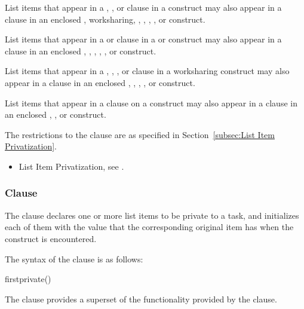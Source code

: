 List items that appear in a , , or
 clause in a  construct may also appear
in a  clause in an enclosed ,
worksharing, , , , , or
 construct.

List items that appear in a  or 
clause in a  or  construct may also appear in a 
clause in an enclosed , , , , , or
 construct.

List items that appear in a , ,
, or  clause in a worksharing
construct may also appear in a  clause in an enclosed
, , , , or  construct.

List items that appear in a  clause on a  construct
may also appear in a  clause in an enclosed , 
, or  construct.

\restrictions
The restrictions to the  clause are as specified in
Section~\ref{subsec:List Item Privatization}.

\crossreferences
\begin{itemize}
    \item List Item Privatization, see .
\end{itemize}



\subsubsection{ Clause}
\label{subsubsec:firstprivate clause}
\summary
The  clause declares one or more list items to be private to a task, and
initializes each of them with the value that the corresponding original item has when the
construct is encountered.

\syntax
The syntax of the  clause is as follows:

\begin{ompSyntax}
firstprivate()
\end{ompSyntax}

\descr
The  clause provides a superset of the functionality provided by the
 clause.

